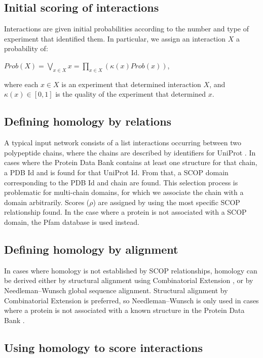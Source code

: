 \documentclass[12pt,twoside]{article}
\def\NI{\noindent}
\def\RS{
	\setlength{\itemsep}{0em}
	\setlength{\parskip}{0.4em}
	\setlength{\parsep}{0em}
}
\begin{document}
\subsection{Initial scoring of interactions}

\NI Interactions are given initial probabilities according to the number and type of experiment that identified them. In particular, we assign an interaction $X$ a probability of:

\NI $Prob(X) = \displaystyle \bigvee_{x \in X} x = \prod_{x \in X} \left( \kappa(x) Prob(x) \right)$,

\NI where each $x \in X$ is an experiment that determined interaction $X$, and $\kappa(x) \in [0,1]$ is the quality of the experiment that determined $x$.

\subsection{Defining homology by relations}
\NI A typical input network consists of a list interactions occurring between two polypeptide chains, where the chains are described by identifiers for UniProt \cite{uniprot}. In cases where the Protein Data Bank \cite{pdb} contains at least one structure for that chain, a PDB Id and is found for that UniProt Id. From that, a SCOP \cite{scop} domain corresponding to the PDB Id and chain are found. This selection process is problematic for multi-chain domains, for which we associate the chain with a domain arbitrarily. Scores ($\rho$) are assigned by using the most specific SCOP relationship found. In the case where a protein is not associated with a SCOP domain, the Pfam database is used instead. \RS

\subsection{Defining homology by alignment}

In cases where homology is not established by SCOP \cite{scop} relationships, homology can be derived either by structural alignment using Combinatorial Extension \cite{ce}, or by Needleman--Wunsch \cite{needleman} global sequence alignment. Structural alignment by Combinatorial Extension is preferred, so Needleman--Wunsch is only used in cases where a protein is not associated with a known structure in the Protein Data Bank \cite{pdb}.

\subsection{Using homology to score interactions}
\end{document}
